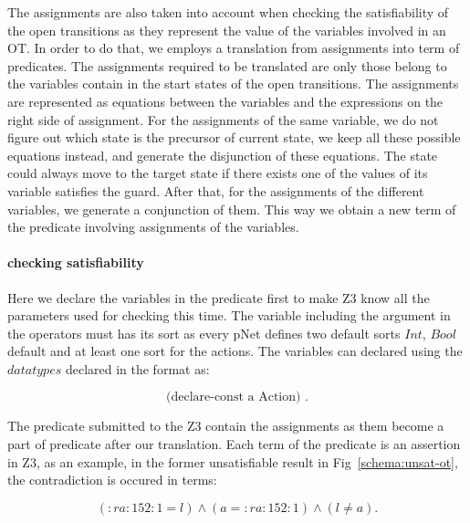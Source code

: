 \documentclass{lncs/llncs}
\newcommand{\TODO}[1]{\textcolor{red}{\textbf{[TODO:#1]}}}
\begin{document}
The assignments are also taken into account when checking the
satisfiability of the open transitions as they represent the value of
the variables involved in an OT. In order to do that, we employs a
translation from assignments into term of predicates. The assignments
required to be translated are only those belong to the variables
contain in the start states of the open transitions. The assignments
are represented as equations between the variables and the expressions
on the right side of assignment. For the assignments of the same
variable, we do not figure out which state is the precursor of current
state, we keep all these possible equations instead, and generate the
disjunction of these equations. The state could always move to the
target state if there exists one of the values of its variable
satisfies the guard.
After that, for the assignments of the different variables, we generate a conjunction of them. This way we obtain a new term of the predicate involving assignments of the variables.


\paragraph{checking satisfiability}

Here we declare the variables in the predicate first to make Z3 know all the parameters used for checking this time. The variable including the argument in the operators must has its sort as every pNet defines two default sorts $Int$, $Bool$ default and at least one sort for the actions. The variables can declared using the $datatypes$ declared in the format as:

\[\text{(declare-const\ a\ Action) .}\]

The predicate submitted to the Z3 contain the assignments as them
become a part of predicate after our translation. Each term of the
predicate is an assertion in Z3, as an example, in the former
unsatisfiable result in Fig~\ref{schema:unsat-ot}, the contradiction is occured in terms: 

\[(:ra:152:1 = l) \land (a = :ra:152:1) \land (l \neq a) .\]
\end{document}
